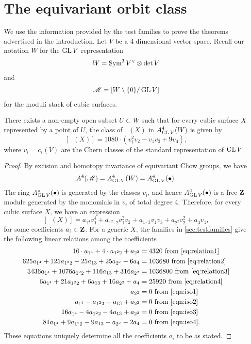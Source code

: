 \documentclass[12pt,reqno]{amsart}
\DeclareMathOperator{\Orb}{\overline{Orb}}
\numberwithin{equation}{section}
\begin{document}
\section{The equivariant orbit class}
\label{sec:tietogether}
We use the information provided by the test families to prove the theorems advertised in the introduction.
Let $V$ be a 4 dimensional vector space.
Recall our notation $W$ for the $\operatorname{GL} V$ representation 
\[W = \operatorname{Sym}^3V^\vee \otimes \det V\]
and
\[\mathscr M = \left[ W \setminus \{0\} / \operatorname{GL} V \right]\]
for the moduli stack of cubic surfaces.
\begin{theorem}\label{thm:eqvclass}
  There exists a non-empty open subset $U \subset W$ such that for every cubic surface $X$ represented by a point of $U$, the class of $\Orb(X)$ in $A^4_{\operatorname{GL} V}(W)$ is given by
  \[
    [\Orb(X)] = 1080 \cdot \left(v_{1}^{2}v_{2} - v_{1}v_{3}+ 9v_{4}\right),
  \]
  where $v_i = c_i(V)$ are the Chern classes of the standard representation of $\operatorname{GL} V$.
\end{theorem}
\begin{proof}
  By excision and homotopy invariance of equivariant Chow groups, we have
  \[ A^4(\mathscr M) = A^4_{\operatorname{GL} V}(W) = A^4_{\operatorname{GL} V}(\bullet).\]
  The ring $A^*_{\operatorname{GL} V}(\bullet)$ is generated by the classes $v_i$, and hence $A^4_{\operatorname{GL} V}(\bullet)$ is a free ${\bf Z}$-module generated by the monomials in $v_i$ of total degree 4.
  Therefore, for every cubic surface $X$, we have an expression
  \[[\Orb(X)] = a_{1^4}v_1^4 + a_{1^2\cdot 2} v_1^2v_2 + a_{1\cdot 3} v_1v_3 + a_{2^2}v_2^2 + a_4 v_4,\]
  for some coefficients $a_i \in {\bf Z}$.
  For a generic $X$, the families in \autoref{sec:testfamilies} give the following linear relations among the coefficients
  \begin{align*}
    16 \cdot a_{1^4} + 4 \cdot a_{1^2 2} + a_{2^2} &= 4320 \text{ from \eqref{eq:relation1}}\\
    625 a_{1^{4}} + 125 a_{1^{2}2} - 25a_{13} + 25a_{2^2} - 6 a_{4} &= 103680 \text{ from \eqref{eq:relation2}}\\
    3436a_{1^4} + 1076 a_{1^{2}2} +116 a_{13} + 316 a_{2^2} &= 1036800 \text{ from \eqref{eq:relation3}}\\
    6a_{1^{4}} + 21a_{1^{2}2}+6a_{13}+16a_{2^{2}}+a_{4} &= 25920 \text{ from \eqref{eq:relation4}}\\
    a_{2^2} &= 0  \text{ from \eqref{eqn:iso1}}\\
    a_{1^4} - a_{1^2 2}- a_{13} +  a_{2^2}  &= 0  \text{ from \eqref{eqn:iso2}}\\
    16a_{1^4} -4a_{1^2 2}- 4a_{13} +  a_{2^2}  &= 0  \text{ from \eqref{eqn:iso3}}\\
    81a_{1^4} +9a_{1^2 2}- 9a_{13} +  a_{2^2}-2a_4  &= 0  \text{ from \eqref{eqn:iso4}}.
  \end{align*}
  These equations uniquely determine all the coefficients $a_i$ to be as stated.
\end{proof}
\end{document}
